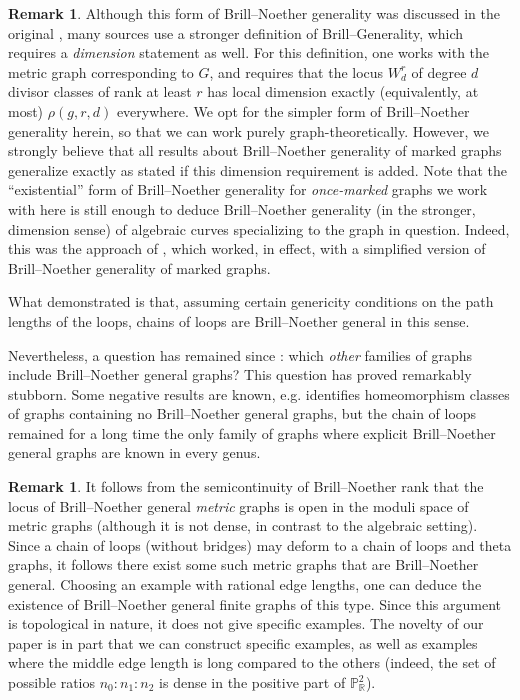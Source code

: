 \documentclass[11pt]{article}
\theoremstyle{definition}
\newtheorem{rema}[theo]{Remark}
\numberwithin{equation}{section}
\begin{document}
\begin{rema}
Although this form of Brill--Noether generality was discussed in the original \cite{BakerSpec}, many sources use a stronger definition of Brill--Generality, which requires a \emph{dimension} statement as well. For this definition, one works with the metric graph corresponding to $G$, and requires that the locus $W^r_d$ of degree $d$ divisor classes of rank at least $r$ has local dimension exactly (equivalently, at most) $\rho(g,r,d)$ everywhere. We opt for the simpler form of Brill--Noether generality herein, so that we can work purely graph-theoretically. However, we strongly believe that all results about Brill--Noether generality of marked graphs generalize exactly as stated if this dimension requirement is added. Note that the ``existential'' form of Brill--Noether generality for \emph{once-marked} graphs we work with here is still enough to deduce Brill--Noether generality (in the stronger, dimension sense) of algebraic curves specializing to the graph in question. Indeed, this was the approach of \cite{CDPR12}, which worked, in effect, with a simplified version of Brill--Noether generality of marked graphs.
\end{rema}

What \cite{CDPR12} demonstrated is that, assuming certain genericity conditions on the path lengths of the loops, chains of loops are Brill--Noether general in this sense.

Nevertheless, a question has remained since \cite{CDPR12}: which \emph{other} families of graphs include Brill--Noether general graphs? This question has proved remarkably stubborn. Some negative results are known, e.g. \cite{jensenNotDense} identifies homeomorphism classes of graphs containing no Brill--Noether general graphs, but the chain of loops remained for a long time the only family of graphs where explicit Brill--Noether general graphs are known in every genus.

\begin{rema}
It follows from the semicontinuity of Brill--Noether rank \cite{lpp,len14} that the locus of Brill--Noether general \emph{metric} graphs is open in the moduli space of metric graphs (although it is not dense, in contrast to the algebraic setting). Since a chain of loops (without bridges) may deform to a chain of loops and theta graphs, it follows there exist some such metric graphs that are Brill--Noether general. 
Choosing an example with rational edge lengths, one can deduce the existence of Brill--Noether general finite graphs of this type. Since this argument is topological in nature, it does not give specific examples. The novelty of our paper is in part that we can construct specific examples, as well as examples where the middle edge length is long compared to the others (indeed, the set of possible ratios $n_0 : n_1 : n_2$ is dense in the positive part of $\mathbb{P}^2_{\mathbb{R}}$).
\end{rema}
\end{document}
